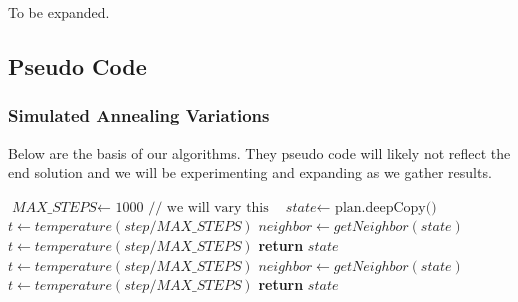 \documentclass{article}
\begin{document}
To be expanded.


\subsection{Pseudo Code}

\subsubsection{Simulated Annealing Variations}
Below are the basis of our algorithms. They pseudo code will likely not reflect the end solution and we will be experimenting and expanding as we gather results.
\\
    \begin{algorithmic}
        \State $\textit{MAX\_STEPS} \gets \text{ 1000 // we will vary this }$
        \State $\textit{state} \gets \text{ plan.deepCopy() }$\\
                \State $t \gets temperature(step/MAX\_STEPS)$
                \State $neighbor \gets getNeighbor(state)$
                    \State $t \gets temperature(step/MAX\_STEPS)$
                \EndIf
            \EndFor
            \State \textbf{return} $state$
            \EndProcedure
            \\
                \State $t \gets temperature(step/MAX\_STEPS)$
                \State $neighbor \gets getNeighbor(state)$
                    \State $t \gets temperature(step/MAX\_STEPS)$
                \EndIf
            \EndFor
            \State \textbf{return} $state$
            \EndProcedure
    \end{algorithmic}
\end{document}

